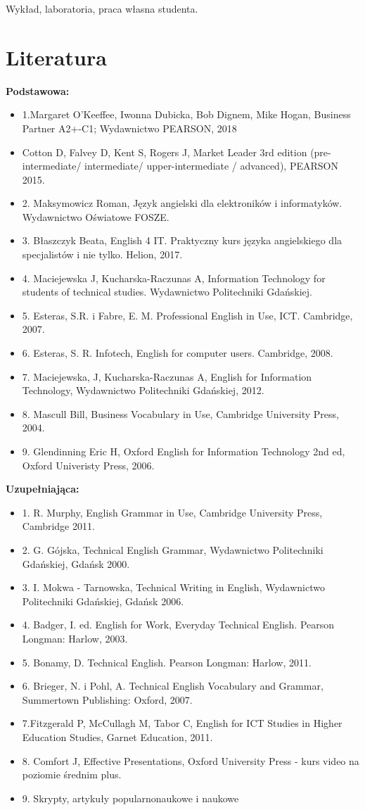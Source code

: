 \documentclass[12pt, a4paper]{article}
\begin{document}
Wykład, laboratoria, praca własna studenta.

\section{Literatura}

\textbf{Podstawowa:}
\begin{itemize}
  \item 1.Margaret O’Keeffee, Iwonna Dubicka, Bob Dignem, Mike Hogan, Business Partner A2+-C1; Wydawnictwo PEARSON, 2018
  \item Cotton D, Falvey D, Kent S, Rogers J, Market Leader 3rd edition (pre-intermediate/ intermediate/ upper-intermediate / advanced), PEARSON 2015.
  \item 2. Maksymowicz Roman, Język angielski dla elektroników i informatyków. Wydawnictwo Oświatowe FOSZE.
  \item 3. Błaszczyk Beata, English 4 IT. Praktyczny kurs języka angielskiego dla specjalistów i nie tylko. Helion, 2017.
  \item 4. Maciejewska J, Kucharska-Raczunas A, Information Technology for students of technical studies. Wydawnictwo Politechniki Gdańskiej.
  \item 5. Esteras, S.R. i Fabre, E. M. Professional English in Use, ICT. Cambridge, 2007.
  \item 6. Esteras, S. R. Infotech,  English for computer users. Cambridge, 2008.
  \item 7. Maciejewska, J, Kucharska-Raczunas A, English for Information Technology, Wydawnictwo Politechniki Gdańskiej, 2012.
  \item 8. Mascull Bill, Business Vocabulary in Use, Cambridge University Press, 2004.
  \item 9. Glendinning Eric H, Oxford English for Information Technology 2nd ed, Oxford Univeristy Press, 2006.
\end{itemize}

\textbf{Uzupełniająca:}
\begin{itemize}
  \item 1. R. Murphy, English Grammar in Use, Cambridge University Press, Cambridge 2011.
  \item 2. G. Gójska, Technical English Grammar, Wydawnictwo Politechniki Gdańskiej, Gdańsk 2000.
  \item 3. I. Mokwa - Tarnowska, Technical Writing in English, Wydawnictwo Politechniki Gdańskiej, Gdańsk 2006.
  \item 4. Badger, I. ed. English for Work, Everyday Technical English. Pearson Longman: Harlow, 2003.
  \item 5. Bonamy, D. Technical English. Pearson Longman: Harlow, 2011.
  \item 6. Brieger, N. i Pohl, A. Technical English Vocabulary and Grammar, Summertown Publishing: Oxford, 2007.
  \item 7.Fitzgerald P, McCullagh M, Tabor C, English for ICT Studies in Higher Education Studies, Garnet Education, 2011.
  \item 8. Comfort J, Effective Presentations, Oxford University Press - kurs video na poziomie średnim plus.
  \item 9. Skrypty, artykuły popularnonaukowe i naukowe
\end{itemize}
\end{document}
